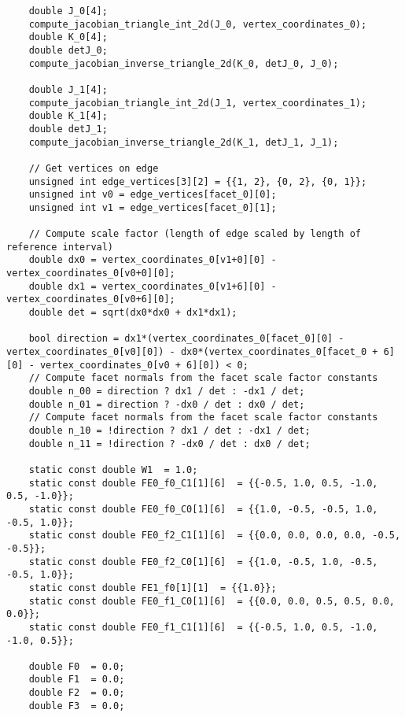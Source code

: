 \documentclass[a4paper]{article}
\begin{document}
\begin{appendices}
\begin{lstlisting}
    double J_0[4];
    compute_jacobian_triangle_int_2d(J_0, vertex_coordinates_0);
    double K_0[4];
    double detJ_0;
    compute_jacobian_inverse_triangle_2d(K_0, detJ_0, J_0);

    double J_1[4];
    compute_jacobian_triangle_int_2d(J_1, vertex_coordinates_1);
    double K_1[4];
    double detJ_1;
    compute_jacobian_inverse_triangle_2d(K_1, detJ_1, J_1);

    // Get vertices on edge
    unsigned int edge_vertices[3][2] = {{1, 2}, {0, 2}, {0, 1}};
    unsigned int v0 = edge_vertices[facet_0][0];
    unsigned int v1 = edge_vertices[facet_0][1];

    // Compute scale factor (length of edge scaled by length of reference interval)
    double dx0 = vertex_coordinates_0[v1+0][0] - vertex_coordinates_0[v0+0][0];
    double dx1 = vertex_coordinates_0[v1+6][0] - vertex_coordinates_0[v0+6][0];
    double det = sqrt(dx0*dx0 + dx1*dx1);

    bool direction = dx1*(vertex_coordinates_0[facet_0][0] - vertex_coordinates_0[v0][0]) - dx0*(vertex_coordinates_0[facet_0 + 6][0] - vertex_coordinates_0[v0 + 6][0]) < 0;
    // Compute facet normals from the facet scale factor constants
    double n_00 = direction ? dx1 / det : -dx1 / det;
    double n_01 = direction ? -dx0 / det : dx0 / det;
    // Compute facet normals from the facet scale factor constants
    double n_10 = !direction ? dx1 / det : -dx1 / det;
    double n_11 = !direction ? -dx0 / det : dx0 / det;
 
    static const double W1  = 1.0;  
    static const double FE0_f0_C1[1][6]  = {{-0.5, 1.0, 0.5, -1.0, 0.5, -1.0}};  
    static const double FE0_f0_C0[1][6]  = {{1.0, -0.5, -0.5, 1.0, -0.5, 1.0}};  
    static const double FE0_f2_C1[1][6]  = {{0.0, 0.0, 0.0, 0.0, -0.5, -0.5}};  
    static const double FE0_f2_C0[1][6]  = {{1.0, -0.5, 1.0, -0.5, -0.5, 1.0}};  
    static const double FE1_f0[1][1]  = {{1.0}};  
    static const double FE0_f1_C0[1][6]  = {{0.0, 0.0, 0.5, 0.5, 0.0, 0.0}};  
    static const double FE0_f1_C1[1][6]  = {{-0.5, 1.0, 0.5, -1.0, -1.0, 0.5}};

    double F0  = 0.0;
    double F1  = 0.0;
    double F2  = 0.0;
    double F3  = 0.0;


\end{lstlisting}
\end{appendices}
\end{document}

